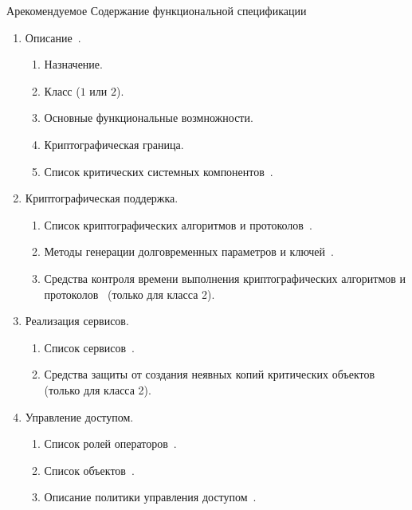 \begin{appendix}{А}{рекомендуемое}
{Содержание функциональной спецификации}
\label{SPEC}

\mbox{}

\begin{enumerate}
\item
{Описание~\TOE.}

\begin{enumerate}
\item
Назначение.
\item
Класс ($1$ или $2$).
\item
Основные функциональные возмножности.
\item
Криптографическая граница.
\item
Список критических системных компонентов~.
\end{enumerate}

\item
{Криптографическая поддержка.}

\begin{enumerate}
\item
Список криптографических алгоритмов и протоколов~.

\item
Методы генерации долговременных параметров и ключей~.

\item
Средства контроля времени выполнения криптографических алгоритмов 
и протоколов~ (только для класса 2).
\end{enumerate}

\item
{Реализация сервисов.}
\begin{enumerate}
\item
Список сервисов~.

\item
Средства защиты от создания неявных копий
критических объектов~ 
(только для класса 2).
\end{enumerate}

\item
{Управление доступом.}

\begin{enumerate}
\item
Список ролей операторов~.

\item
Список объектов~.

\item
Описание политики управления доступом~.


\end{enumerate}
\end{enumerate}
\end{appendix}

